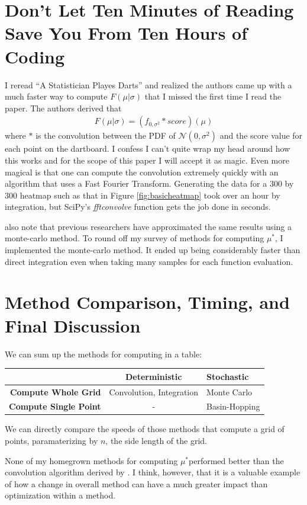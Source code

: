 \documentclass[]{article}
\newcommand{\mustar}{\ensuremath{\mu^* }}
\begin{document}
\section{Don't Let Ten Minutes of Reading Save You From Ten Hours of Coding}
I reread ``A Statistician Playes Darts''\cite{stat} and realized the authors came up with a much faster way to compute $F(\mu \vert \sigma)$ that I missed the first time I read the paper. The authors derived that
\begin{align}
	F(\mu \vert \sigma)  =(f_{0, \sigma^2} * score)(\mu)
\end{align}
 where $*$ is the convolution between the PDF of $\mathcal{N}(0, \sigma^2)$ and the score value for each point on the dartboard\cite{stat}. I confess I can't quite wrap my head around how this works and for the scope of this paper I will accept it as magic. Even more magical is that one can compute the convolution extremely quickly with an algorithm that uses a Fast Fourier Transform. Generating the data for a 300 by 300 heatmap such as that in Figure \ref{fig:basicheatmap} took over an hour by integration, but SciPy's \textit{fftconvolve} function gets the job done in seconds. 

\citeauthor{stat} also note that previous researchers have approximated the same results using a monte-carlo method\cite{stat}. To round off my  survey of methods for computing \mustar, I implemented the monte-carlo method. It ended up being considerably faster than direct integration even when taking many samples for each function evaluation. 

\section{Method Comparison, Timing, and Final Discussion}\label{sec:timing}

We can sum up the methods for computing in a table:

\begin{table}[h]
	\centering
	\begin{tabular}{r | c l}
		& \textbf{Deterministic} & \textbf{Stochastic} \\ \hline
		\textbf{Compute Whole Grid}& Convolution, Integration & Monte Carlo \\
		\textbf{Compute Single Point}& - & Basin-Hopping
	\end{tabular}
\end{table}

We can directly compare the speeds of those methods that compute a grid of points, paramaterizing by $n$, the side length of the grid. 

None of my homegrown methods for computing \mustar performed better than the convolution algorithm derived by \citeauthor{stat}. I think, however, that it is a valuable example of how a change in overall method can have a much greater impact than optimization within a method. 










	

\printbibliography
\end{document}
